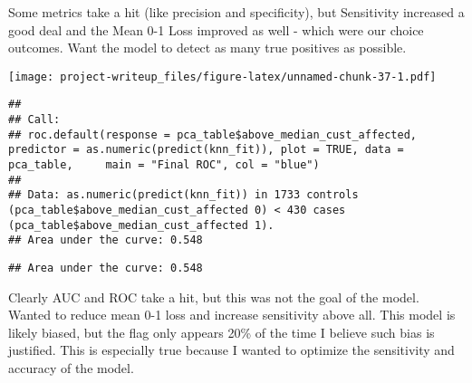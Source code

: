 \documentclass[
]{article}
\newenvironment{Shaded}{\begin{snugshade}}{\end{snugshade}}
\newcommand{\CommentTok}[1]{\textcolor[rgb]{0.56,0.35,0.01}{\textit{#1}}}
\newcommand{\DataTypeTok}[1]{\textcolor[rgb]{0.13,0.29,0.53}{#1}}
\newcommand{\KeywordTok}[1]{\textcolor[rgb]{0.13,0.29,0.53}{\textbf{#1}}}
\newcommand{\NormalTok}[1]{#1}
\newcommand{\OperatorTok}[1]{\textcolor[rgb]{0.81,0.36,0.00}{\textbf{#1}}}
\newcommand{\OtherTok}[1]{\textcolor[rgb]{0.56,0.35,0.01}{#1}}
\newcommand{\StringTok}[1]{\textcolor[rgb]{0.31,0.60,0.02}{#1}}
\begin{document}
Some metrics take a hit (like precision and specificity), but
Sensitivity increased a good deal and the Mean 0-1 Loss improved as well
- which were our choice outcomes. Want the model to detect as many true
positives as possible.

\begin{Shaded}
\end{Shaded}

\texttt{[image: project-writeup\_files/figure-latex/unnamed-chunk-37-1.pdf]}

\begin{verbatim}
## 
## Call:
## roc.default(response = pca_table$above_median_cust_affected,     predictor = as.numeric(predict(knn_fit)), plot = TRUE, data = pca_table,     main = "Final ROC", col = "blue")
## 
## Data: as.numeric(predict(knn_fit)) in 1733 controls (pca_table$above_median_cust_affected 0) < 430 cases (pca_table$above_median_cust_affected 1).
## Area under the curve: 0.548
\end{verbatim}

\begin{Shaded}
\end{Shaded}

\begin{verbatim}
## Area under the curve: 0.548
\end{verbatim}

Clearly AUC and ROC take a hit, but this was not the goal of the model.
Wanted to reduce mean 0-1 loss and increase sensitivity above all. This
model is likely biased, but the flag only appears 20\% of the time I
believe such bias is justified. This is especially true because I wanted
to optimize the sensitivity and accuracy of the model.
\end{document}

